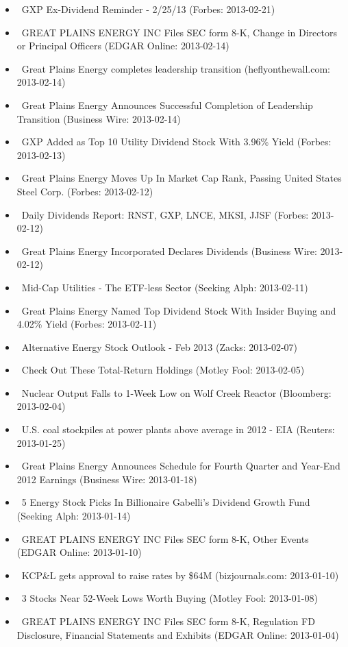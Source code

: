 \documentclass[11pt,asymmetric]{article}
\begin{document}
\begin{itemize}
\item\ GXP Ex-Dividend Reminder - 2/25/13 (Forbes: 2013-02-21)
\item\ GREAT PLAINS ENERGY INC Files SEC form 8-K, Change in Directors or Principal Officers (EDGAR Online: 2013-02-14)
\item\ Great Plains Energy completes leadership transition (heflyonthewall.com: 2013-02-14)
\item\ Great Plains Energy Announces Successful Completion of Leadership Transition (Business Wire: 2013-02-14)
\item\ GXP Added as Top 10 Utility Dividend Stock With 3.96\% Yield (Forbes: 2013-02-13)
\item\ Great Plains Energy Moves Up In Market Cap Rank, Passing United States Steel Corp. (Forbes: 2013-02-12)
\item\ Daily Dividends Report: RNST, GXP, LNCE, MKSI, JJSF (Forbes: 2013-02-12)
\item\ Great Plains Energy Incorporated Declares Dividends (Business Wire: 2013-02-12)
\item\ Mid-Cap Utilities - The ETF-less Sector (Seeking Alph: 2013-02-11)
\item\ Great Plains Energy Named Top Dividend Stock With Insider Buying and 4.02\% Yield (Forbes: 2013-02-11)
\item\ Alternative Energy Stock Outlook - Feb 2013 (Zacks: 2013-02-07)
\item\ Check Out These Total-Return Holdings (Motley Fool: 2013-02-05)
\item\ Nuclear Output Falls to 1-Week Low on Wolf Creek Reactor (Bloomberg: 2013-02-04)
\item\ U.S. coal stockpiles at power plants above average in 2012 - EIA (Reuters: 2013-01-25)
\item\ Great Plains Energy Announces Schedule for Fourth Quarter and Year-End 2012 Earnings (Business Wire: 2013-01-18)
\item\ 5 Energy Stock Picks In Billionaire Gabelli's Dividend Growth Fund (Seeking Alph: 2013-01-14)
\item\ GREAT PLAINS ENERGY INC Files SEC form 8-K, Other Events (EDGAR Online: 2013-01-10)
\item\ KCP\&L gets approval to raise rates by \$64M (bizjournals.com: 2013-01-10)
\item\ 3 Stocks Near 52-Week Lows Worth Buying (Motley Fool: 2013-01-08)
\item\ GREAT PLAINS ENERGY INC Files SEC form 8-K, Regulation FD Disclosure, Financial Statements and Exhibits (EDGAR Online: 2013-01-04)

\end{itemize}
\end{document}
